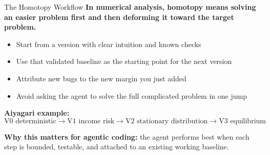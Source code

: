 \documentclass[10pt,english,aspectratio=169]{beamer}
\begin{document}
\begin{frame}{The Homotopy Workflow}
\textbf{In numerical analysis, homotopy means solving an easier problem first and then deforming it toward the target problem.}

\vspace{0.25cm}

\begin{itemize}
    \item Start from a version with clear intuition and known checks
    \item Use that validated baseline as the starting point for the next version
    \item Attribute new bugs to the new margin you just added
    \item Avoid asking the agent to solve the full complicated problem in one jump
\end{itemize}

\vspace{0.3cm}

\textbf{Aiyagari example:}
\[
\text{V0 deterministic} \rightarrow \text{V1 income risk} \rightarrow \text{V2 stationary distribution} \rightarrow \text{V3 equilibrium}
\]

\vspace{0.15cm}

\textbf{Why this matters for agentic coding:} the agent performs best when each step is bounded, testable, and attached to an existing working baseline.
\end{frame}
\end{document}
